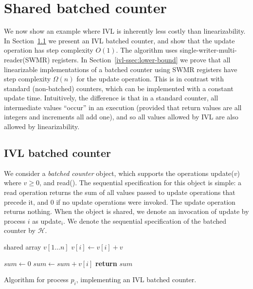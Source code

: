 \section{Shared batched counter}
\label{ivl-sec:adder}

We now show an example where IVL is inherently less costly than linearizability.
In Section~\ref{ivl-ssec:ivl-adder} we present an IVL batched counter, and show that the {\sc update} operation
has step complexity $O(1)$. The algorithm uses single-writer-multi-reader(SWMR) registers.
In Section~\ref{ivl-ssec:lower-bound} we prove that all linearizable implementations
of a batched counter using SWMR registers have step complexity $\Omega(n)$ for the {\sc update} operation.
This is in contrast with standard (non-batched) counters, which can be implemented with
a constant update time. Intuitively, the difference is that in a standard counter,
all intermediate values ``occur'' in an execution (provided that return values are
all integers and increments all add one),  and so all values allowed by IVL are also
allowed by linearizability.

\subsection{IVL batched counter}
\label{ivl-ssec:ivl-adder}

We consider a \emph{batched counter} object, which supports the operations {\sc update}($v$) where $v \geq 0$, and {\sc read}().
The sequential specification for this object is simple: a {\sc read} operation returns the sum of all values passed to {\sc update}
operations that precede it, and $0$ if no {\sc update} operations were invoked. The {\sc update} operation returns nothing. When the
object is shared, we denote an invocation of {\sc update} by process $i$ as {\sc update}$_i$. We denote the sequential specification
of the batched counter by ${\mathcal H}$.

\begin{algorithm}
    \begin{algorithmic}[1]

        \State shared array $v[1 \dots n]$
        \State $v[i] \gets v[i] + v$
        \EndProcedure


        \State $\mathit{sum} \gets 0$
        \State $\mathit{sum} \gets \mathit{sum} + v[i]$
        \EndFor
        \State \textbf{return} $\mathit{sum}$
        \EndProcedure
    \end{algorithmic}
    \caption{Algorithm for process $p_i$, implementing an IVL batched counter.}
    \label{ivl-alg:ivl-adder}
\end{algorithm}

